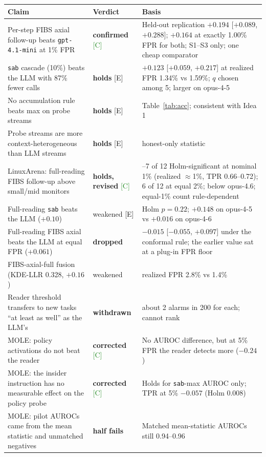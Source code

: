 \documentclass[11pt]{article}
\newcommand{\tC}{\textsf{\scriptsize\textcolor{ForestGreen}{[C]}}\xspace}
\newcommand{\tE}{\textsf{\scriptsize\textcolor{ink2}{[E]}}\xspace}
\begin{document}
\begin{table}[!htbp]\centering\footnotesize
\begin{tabularx}{\linewidth}{@{}>{\raggedright\arraybackslash}p{5.0cm}>{\raggedright\arraybackslash}p{2.1cm}>{\raggedright\arraybackslash}X@{}}
\toprule
Claim & Verdict & Basis\\
\midrule
Per-step FIBS axial follow-up beats \texttt{gpt-4.1-mini} at 1\% FPR & \textbf{confirmed} \tC & Held-out replication $+0.194$ [$+0.089$, $+0.288$]; $+0.164$ at exactly 1.00\% FPR for both; S1--S3 only; one cheap comparator\\
\texttt{sab} cascade (10\%) beats the LLM with 87\% fewer calls & \textbf{holds} \tE & $+0.123$ [$+0.059$, $+0.217$] at realized FPR 1.34\% vs 1.59\%; $q$ chosen among 5; larger on opus-4-5\\
No accumulation rule beats max on probe streams & \textbf{holds} \tE & Table~\ref{tab:acc}; consistent with Idea 1\\
Probe streams are more context-heterogeneous than LLM streams & \textbf{holds} \tE & honest-only statistic\\
LinuxArena: full-reading FIBS follow-up above small/mid monitors & \textbf{holds, revised} \tC & 6--7 of 12 Holm-significant at nominal 1\% (realized $\approx$1\%, TPR 0.66--0.72); 6 of 12 at equal 2\%; below opus-4.6; equal-1\% count rule-dependent\\
Full-reading \texttt{sab} beats the LLM ($+0.10$) & weakened \tE & Holm $p=0.22$; $+0.148$ on opus-4-5 vs $+0.016$ on opus-4-6\\
Full-reading FIBS axial beats the LLM at equal FPR ($+0.061$) & \textbf{dropped} & $-0.015$ [$-0.055$, $+0.097$] under the conformal rule; the earlier value sat at a plug-in FPR floor\\
FIBS-axial-full fusion (KDE-LLR 0.328, $+0.16$) & weakened & realized FPR 2.8\% vs 1.4\%\\
Reader threshold transfers to new tasks ``at least as well'' as the LLM's & \textbf{withdrawn} & about 2 alarms in 200 for each; cannot rank\\
MOLE: policy activations do not beat the reader & \textbf{corrected} \tC & No AUROC difference, but at 5\% FPR the reader detects more ($-0.24$)\\
MOLE: the insider instruction has no measurable effect on the policy probe & \textbf{corrected} \tC & Holds for \texttt{sab}-max AUROC only; TPR at 5\% $-0.057$ (Holm 0.008)\\
MOLE: pilot AUROCs came from the mean statistic and unmatched negatives & \textbf{half fails} & Matched mean-statistic AUROCs still 0.94--0.96\\

\end{tabularx}
\end{table}
\end{document}
